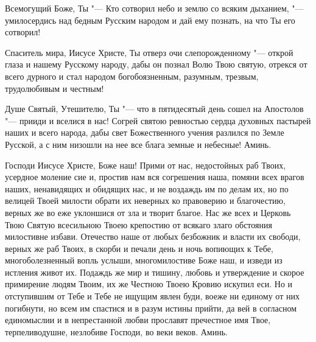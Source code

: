 \mychapterending




Всемогущий Боже, Ты "--- Кто сотворил небо и землю со всяким дыханием, "--- умилосердись над бедным Русским народом и дай ему познать, на что Ты его сотворил! 

Спаситель мира, Иисусе Христе, Ты отверз очи слепорожденному "--- открой глаза и нашему Русскому народу, дабы он познал Волю Твою святую, отрекся от всего дурного и стал народом богобоязненным, разумным, трезвым, трудолюбивым и честным! 

Душе Святый, Утешителю, Ты "--- что в пятидесятый день сошел на Апостолов "--- прииди и вселися в нас! Согрей святою ревностью сердца духовных пастырей наших и всего народа, дабы свет Божественного учения разлился по Земле Русской, а с ним низошли на нее все блага земные и небесные! Аминь. 


\mychapterending




Господи Иисусе Христе, Боже наш! Прими от нас, недостойных раб Твоих, усердное моление сие и, простив нам вся согрешения наша, помяни всех врагов наших, ненавидящих и обидящих нас, и не воздаждь им по делам их, но по велицей Твоей милости обрати их неверных ко правоверию и благочестию, верных же во еже уклоншися от зла и творит благое. Нас же всех и Церковь Твою Святую всесильною Твоею крепостию от всякаго злаго обстояния милостивне избави. Отечество наше от любых безбожник и власти их свободи, верных же раб Твоих, в скорби и печали день и ночь вопиющих к Тебе, многоболезненный вопль услыши, многомилостиве Боже наш, и изведи из истления живот их. Подаждь же мир и тишину, любовь и утверждение и скорое примирение людям Твоим, их же Честною Твоею Кровию искупил еси. Но и отступившим от Тебе и Тебе не ищущим явлен буди, воеже ни единому от них погибнути, но всем им спастися и в разум истины прийти, да вей в согласном единомыслии и в непрестанной любви прославят пречестное имя Твое, терпеливодушне, незлобиве Господи, во веки веков. Аминь. 





\mychapterending




